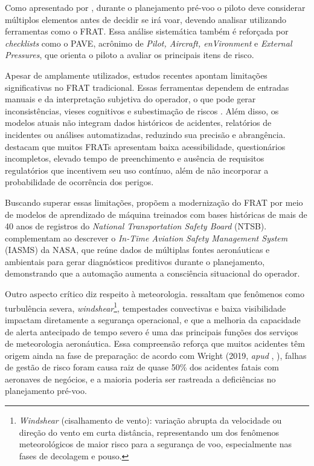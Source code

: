 \documentclass[english,brazilian]{UNISINOSartigo}
\begin{document}
Como apresentado por , durante o planejamento pré-voo
o piloto deve considerar múltiplos elementos antes de decidir se irá voar, devendo
analisar utilizando ferramentas como o FRAT. Essa análise sistemática também é
reforçada por \textit{checklists} como o PAVE, acrônimo de \textit{Pilot,
Aircraft, enVironment} e \textit{External Pressures}, que orienta o piloto a avaliar
os principais itens de risco.

Apesar de amplamente utilizados, estudos recentes apontam limitações
significativas no FRAT tradicional. Essas ferramentas dependem de entradas manuais
e da interpretação subjetiva do operador, o que pode gerar inconsistências, vieses
cognitivos e subestimação de riscos \cite{WALDEN2023}. Além disso, os modelos
atuais não integram dados históricos de acidentes, relatórios de incidentes ou
análises automatizadas, reduzindo sua precisão e abrangência. 
destacam que muitos FRATs apresentam baixa acessibilidade, questionários
incompletos, elevado tempo de preenchimento e ausência de requisitos regulatórios
que incentivem seu uso contínuo, além de não incorporar a probabilidade de
ocorrência dos perigos.

Buscando superar essas limitações,  propõem a
modernização do FRAT por meio de modelos de aprendizado de máquina treinados
com bases históricas de mais de 40 anos de registros do \textit{National
Transportation Safety Board} (NTSB).  complementam ao
descrever o \textit{In-Time Aviation Safety Management System} (IASMS) da NASA,
que reúne dados de múltiplas fontes aeronáuticas e ambientais para gerar
diagnósticos preditivos durante o planejamento, demonstrando que a automação
aumenta a consciência situacional do operador.

Outro aspecto crítico diz respeito à meteorologia.  ressaltam que
fenômenos como turbulência severa, \textit{windshear}\footnote{\textit{Windshear}
(cisalhamento de vento): variação abrupta da velocidade ou direção do vento em
curta distância, representando um dos fenômenos meteorológicos de maior risco
para a segurança de voo, especialmente nas fases de decolagem e pouso.},
tempestades convectivas e
baixa visibilidade impactam diretamente a segurança operacional, e que a melhoria
da capacidade de alerta antecipado de tempo severo é uma das principais funções
dos serviços de meteorologia aeronáutica. Essa compreensão reforça que muitos
acidentes têm origem ainda na fase de preparação: de acordo com Wright
(2019, \textit{apud} \citeauthor{WALDEN2023}, \citeyear{WALDEN2023}), falhas de
gestão de risco foram causa raiz de quase 50\% dos acidentes fatais com aeronaves
de negócios, e a maioria poderia ser rastreada a deficiências no planejamento
pré-voo.
\end{document}
